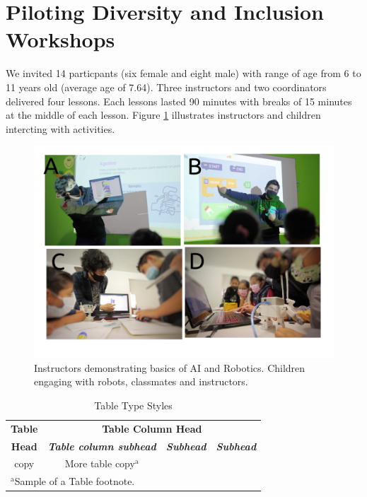 \documentclass[conference]{IEEEtran}
\begin{document}
\section{Piloting Diversity and Inclusion Workshops}
We invited 14 particpants (six female and eight male) with range of age from 6 to 11 years old (average age of 7.64).
Three instructors and two coordinators delivered four lessons. 
Each lessons lasted 90 minutes with breaks of 15 minutes at the middle of each lesson. 
Figure \ref{fig:pilot} illustrates instructors and children intercting with activities. 
\begin{figure}[htbp]
    \centerline{\includegraphics[width=\linewidth]{piloting-workshops/versions/drawing-v00.png}}
    \caption{Instructors demonstrating basics of AI and Robotics. 
    Children engaging with robots, classmates and instructors.}
    \label{fig:pilot}
\end{figure}


\begin{table}[htbp]
    \caption{Table Type Styles}
    \begin{center}
    \begin{tabular}{|c|c|c|c|}
    \hline
    \textbf{Table}&\multicolumn{3}{|c|}{\textbf{Table Column Head}} \\
    \cline{2-4} 
    \textbf{Head} & \textbf{\textit{Table column subhead}}& \textbf{\textit{Subhead}}& \textbf{\textit{Subhead}} \\
    \hline
    copy& More table copy$^{\mathrm{a}}$& &  \\
    \hline
    \multicolumn{4}{l}{$^{\mathrm{a}}$Sample of a Table footnote.}
    \end{tabular}
    \label{tab1}
    \end{center}
\end{table}
    
\end{document}
